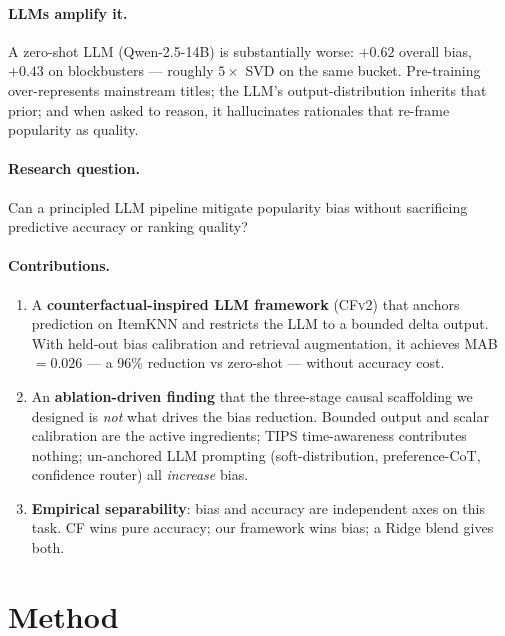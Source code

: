 \documentclass[11pt,a4paper]{article}
\begin{document}
\paragraph{LLMs amplify it.}
A zero-shot LLM (Qwen-2.5-14B) is substantially worse: $+0.62$ overall
bias, $+0.43$ on blockbusters — roughly $5\times$ SVD on the same bucket.
Pre-training over-represents mainstream titles; the LLM's
output-distribution inherits that prior; and when asked to reason, it
hallucinates rationales that re-frame popularity as quality.

\paragraph{Research question.}
Can a principled LLM pipeline mitigate popularity bias without
sacrificing predictive accuracy or ranking quality?

\paragraph{Contributions.}
\begin{enumerate}[leftmargin=1.8em,itemsep=2pt,topsep=2pt]
\item A \textbf{counterfactual-inspired LLM framework} (\textsc{CFv2}) that
      anchors prediction on ItemKNN and restricts the LLM to a bounded
      delta output. With held-out bias calibration and retrieval
      augmentation, it achieves MAB~$=0.026$ — a 96\% reduction vs
      zero-shot — without accuracy cost.
\item An \textbf{ablation-driven finding} that the three-stage causal
      scaffolding we designed is \emph{not} what drives the bias
      reduction. Bounded output and scalar calibration are the active
      ingredients; TIPS time-awareness contributes nothing; un-anchored
      LLM prompting (soft-distribution, preference-CoT, confidence
      router) all \emph{increase} bias.
\item \textbf{Empirical separability}: bias and accuracy are independent
      axes on this task. CF wins pure accuracy; our framework wins bias;
      a Ridge blend gives both.
\end{enumerate}

\section{Method}
\label{sec:method}
\end{document}
